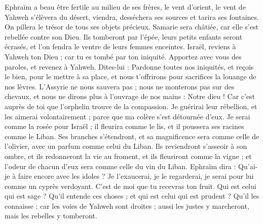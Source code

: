 \begin{multicols}{2}
Ephraïm a beau être fertile au milieu de ses frères, le vent d’orient, le vent de Yahweh s’élèvera du désert, viendra, desséchera ses sources et tarira ses fontaines. On pillera le trésor de tous ses objets précieux.
Samarie sera châtiée, car elle s'est rebellée contre son Dieu. Ils tomberont par l'épée, leurs petits enfants seront écrasés, et l’on fendra le ventre de leurs femmes enceintes.
\VerseOne{}Israël, reviens à Yahweh ton Dieu ; car tu es tombé par ton iniquité.
Apportez avec vous des paroles, et revenez à Yahweh. Dites-lui : Pardonne toutes nos iniquités, et reçois le bien, pour le mettre à sa place, et nous t’offrirons pour sacrifices la louange de nos lèvres.
L'Assyrie ne nous sauvera pas ; nous ne monterons pas sur des chevaux, et nous ne dirons plus à l'ouvrage de nos mains : Notre dieu ! Car c’est auprès de toi que l'orphelin trouve de la compassion.
Je guérirai leur rébellion, et les aimerai volontairement ; parce que ma colère s'est détournée d’eux.
Je serai comme la rosée pour Israël ; il fleurira comme le lis, et il poussera ses racines comme le Liban.
Ses branches s’étendront, et sa magnificence sera comme celle de l'olivier, avec un parfum comme celui du Liban.
Ils reviendront s’asseoir à son ombre, et ils redonneront la vie au froment, et ils fleuriront comme la vigne ; et l'odeur de chacun d'eux sera comme celle du vin du Liban.
Ephraïm dira : Qu'ai-je à faire encore avec les idoles ? Je l'exaucerai, je le regarderai, je serai pour lui comme un cyprès verdoyant. C’est de moi que tu recevras ton fruit.
Qui est celui qui est sage ? Qu'il entende ces choses ; et qui est celui qui est prudent ? Qu'il les connaisse ; car les voies de Yahweh sont droites ; aussi les justes y marcheront, mais les rebelles y tomberont.
\PPE{}
\end{multicols}
